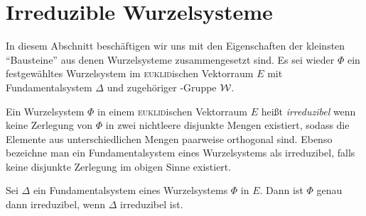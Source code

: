 \section{Irreduzible Wurzelsysteme}

In diesem Abschnitt beschäftigen wir uns mit den Eigenschaften der kleinsten ``Bausteine'' aus denen Wurzelsysteme zusammengesetzt sind.
Es sei wieder $\Phi$ ein festgewähltes Wurzelsystem im \textsc{euklid}ischen Vektorraum $E$ mit Fundamentalsystem $\Delta$ und zugehöriger \weyl\hyp{}Gruppe $\mathcal{W}$.

\begin{defn}
  Ein Wurzelsystem $\Phi$ in einem \textsc{euklid}ischen Vektorraum $E$ heißt \emph{irreduzibel} wenn keine Zerlegung von $\Phi$ in zwei nichtleere disjunkte Mengen existiert, sodass die Elemente aus unterschiedlichen Mengen paarweise orthogonal sind.
  Ebenso bezeichne man ein Fundamentalsystem eines Wurzelsystems als irreduzibel, falls keine disjunkte Zerlegung im obigen Sinne existiert.
\end{defn}

\begin{lem}
  \label{lem:irreducibleRoot}
  Sei $\Delta$ ein Fundamentalsystem eines Wurzelsystems $\Phi$ in $E$.
  Dann ist $\Phi$ genau dann irreduzibel, wenn $\Delta$ irreduzibel ist.
\end{lem}

